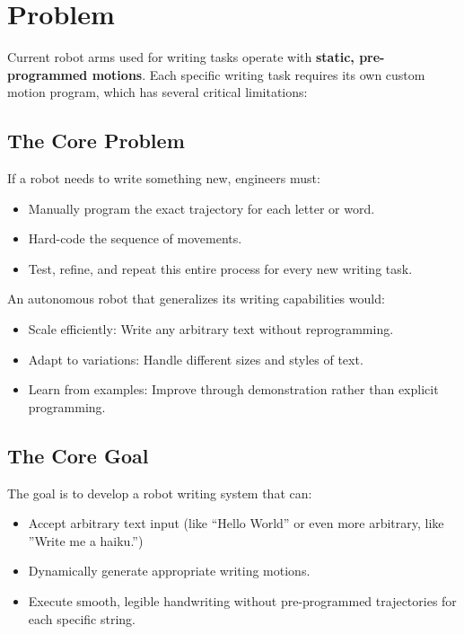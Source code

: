 \documentclass[12pt,a4paper]{article}
\begin{document}
\section{Problem}

Current robot arms used for writing tasks operate with \textbf{static, pre-programmed motions}. Each specific writing task requires its own custom motion program, which has several critical limitations:

\subsection{The Core Problem}

If a robot needs to write something new, engineers must:
\begin{itemize}
    \item Manually program the exact trajectory for each letter or word.
    \item Hard-code the sequence of movements.
    \item Test, refine, and repeat this entire process for every new writing task.
\end{itemize}
An autonomous robot that generalizes its writing capabilities would:
\begin{itemize}
    \item Scale efficiently: Write any arbitrary text without reprogramming.
    \item Adapt to variations: Handle different sizes and styles of text.
    \item Learn from examples: Improve through demonstration rather than explicit programming.
\end{itemize}

\subsection{The Core Goal}

The goal is to develop a robot writing system that can:
\begin{itemize}
    \item Accept arbitrary text input (like ``Hello World'' or even more arbitrary, like ''Write me a haiku.'')
    \item Dynamically generate appropriate writing motions.
    \item Execute smooth, legible handwriting without pre-programmed trajectories for each specific string.
\end{itemize}
\newpage
\end{document}
